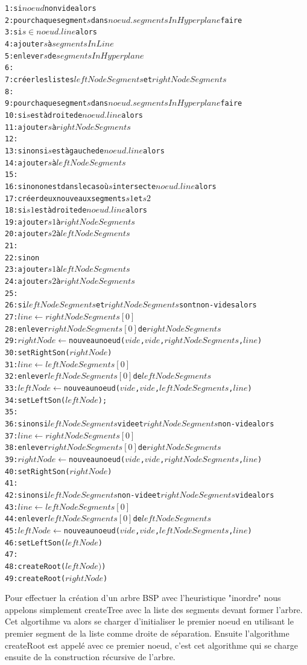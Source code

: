 \documentclass[11pt,a4paper]{article}
\begin{document}
\begin{alltt}
 1: si \(noeud\) non vide alors
 2:   pour chaque segment \(s\) dans \(noeud.segmentsInHyperplane\) faire
 3:     si \(s \in noeud.line\) alors
 4:       ajouter \(s\) à \(segmentsInLine\)
 5:       enlever \(s\) de \(segmentsInHyperplane\)
 6:       
 7:   créer les listes \(leftNodeSegments\) et \(rightNodeSegments\)
 8:   
 9:   pour chaque segment \(s\) dans \(noeud.segmentsInHyperplane\) faire
10:     si \(s\) est à droite de \(noeud.line\) alors
11:       ajouter \(s\) à \(rightNodeSegments\)
12:
13:     sinon si \(s\) est à gauche de \(noeud.line\) alors
14:       ajouter \(s\) à \(leftNodeSegments\)
15:
16:     sinon on est dans le cas où \(s\) intersecte \(noeud.line\) alors
17:       créer deux nouveaux segments \(s1\) et \(s2\)
18:       si \(s1\) est à droite de \(noeud.line\) alors
19:         ajouter \(s1\) à \(rightNodeSegments\)
20:         ajouter \(s2\) à \(leftNodeSegments\)
21:
22:       sinon
23:         ajouter \(s1\) à \(leftNodeSegments\)
24:         ajouter \(s2\) à \(rightNodeSegments\)
25:         
26:   si \(leftNodeSegments\) et \(rightNodeSegments\) sont non-vides alors
27:     \(line \leftarrow rightNodeSegments[0]\)
28:     enlever \(rightNodeSegments[0]\) de \(rightNodeSegments\)
29:     \(rightNode \leftarrow\) nouveau noeud (\(vide\), \(vide\), \(rightNodeSegments\), \(line\))
30:     setRightSon(\(rightNode\))
31:     \(line \leftarrow leftNodeSegments[0]\)
32:     enlever \(leftNodeSegments[0]\) de \(leftNodeSegments\)
33:     \(leftNode \leftarrow\) nouveau noeud (\(vide\), \(vide\), \(leftNodeSegments\), \(line\))
34:     setLeftSon(\(leftNode\));
35:     
36:   sinon si \(leftNodeSegments\) vide et \(rightNodeSegments\) non-vide alors
37:     \(line \leftarrow rightNodeSegments[0]\)
38:     enlever \(rightNodeSegments[0]\) de \(rightNodeSegments\)
39:     \(rightNode \leftarrow \) nouveau noeud (\(vide\), \(vide\), \(rightNodeSegments\), \(line\))
40:     setRightSon(\(rightNode\))
41:    
42:   sinon si \(leftNodeSegments\) non-vide et \(rightNodeSegments\) vide alors
43:     \(line \leftarrow leftNodeSegments[0]\)
44:     enlever \(leftNodeSegments[0]\) de \(leftNodeSegments\)
45:     \(leftNode \leftarrow \) nouveau noeud (\(vide\), \(vide\), \(leftNodeSegments\), \(line\))
46:     setLeftSon(\(leftNode\))
47:     
48:   createRoot(\(leftNode)\))
49:   createRoot(\(rightNode\))
\end{alltt}

Pour effectuer la création d'un arbre BSP avec l'heuristique "inordre" nous appelons simplement createTree avec la liste des segments devant former l'arbre. Cet algortihme va alors se charger d'initialiser le premier noeud en utilisant le premier segment de la liste comme droite de séparation. Ensuite l'algorithme createRoot est appelé avec ce premier noeud, c'est cet algorithme qui se charge ensuite de la construction récursive de l'arbre. \\
\end{document}
